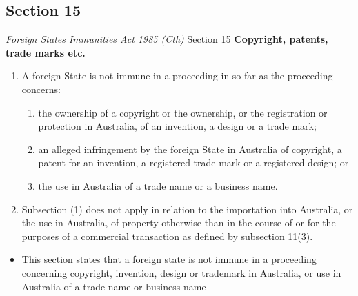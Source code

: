 \subsection{Section 15}
\begin{statutedetails}{\textit{Foreign States Immunities Act 1985 (Cth)} Section 15}
    \flushleft
    \textbf{Copyright, patents, trade marks etc.}

    \begin{enumerate}[label=(\arabic*)]
        \item A foreign State is not immune in a proceeding in so far as the proceeding concerns:
        \begin{enumerate}[label=(\alph*)]
            \item the ownership of a copyright or the ownership, or the registration or protection in Australia, of an invention, a design or a trade mark;
            \item an alleged infringement by the foreign State in Australia of copyright, a patent for an invention, a registered trade mark or a registered design; or
            \item the use in Australia of a trade name or a business name.
        \end{enumerate}
        \item Subsection (1) does not apply in relation to the importation into Australia, or the use in Australia, of property otherwise than in the course of or for the purposes of a commercial transaction as defined by subsection 11(3).
    \end{enumerate}
\end{statutedetails}

\begin{itemize}
    \item This section states that a foreign state is not immune in a proceeding concerning copyright, invention, design or trademark in Australia, or use in Australia of a trade name or business name
\end{itemize}

